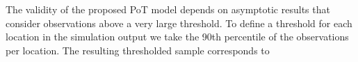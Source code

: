 The validity of the proposed PoT model depends on asymptotic results that consider 
    observations above a very large threshold. To define a threshold
    for each location in the simulation output we take the 90th percentile 
    of the observations per location.  The resulting thresholded sample corresponds to
